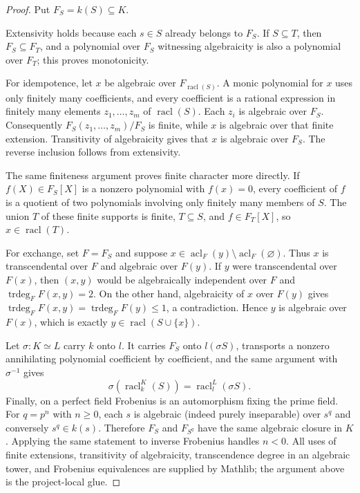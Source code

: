 \documentclass[11pt,oneside]{article}
\theoremstyle{definition}
\theoremstyle{remark}
\newcommand{\acl}{\operatorname{acl}}
\newcommand{\trdeg}{\operatorname{trdeg}}
\begin{document}
\begin{proof}
Put $F_S=k(S)\subseteq K$.

Extensivity holds because each $s\in S$ already belongs to $F_S$.  If $S\subseteq T$,
then $F_S\subseteq F_T$, and a polynomial over $F_S$ witnessing algebraicity is also a
polynomial over $F_T$; this proves monotonicity.

For idempotence, let $x$ be algebraic over
$F_{\operatorname{racl}(S)}$.  A monic polynomial for $x$ uses only finitely many
coefficients, and every coefficient is a rational expression in finitely many elements
$z_1,\ldots,z_m$ of $\operatorname{racl}(S)$.  Each $z_i$ is algebraic over $F_S$.
Consequently $F_S(z_1,\ldots,z_m)/F_S$ is finite, while $x$ is algebraic over that
finite extension.  Transitivity of algebraicity gives that $x$ is algebraic over $F_S$.
The reverse inclusion follows from extensivity.

The same finiteness argument proves finite character more directly.  If
$f(X)\in F_S[X]$ is a nonzero polynomial with $f(x)=0$, every coefficient of $f$ is a
quotient of two polynomials involving only finitely many members of $S$.  The union $T$
of these finite supports is finite, $T\subseteq S$, and $f\in F_T[X]$, so
$x\in\operatorname{racl}(T)$.

For exchange, set $F=F_S$ and suppose
$x\in\acl_F(y)\setminus\acl_F(\varnothing)$.  Thus $x$ is transcendental over $F$ and
algebraic over $F(y)$.  If $y$ were transcendental over $F(x)$, then $(x,y)$ would be
algebraically independent over $F$ and $\trdeg_FF(x,y)=2$.  On the other hand,
algebraicity of $x$ over $F(y)$ gives
$\trdeg_FF(x,y)=\trdeg_FF(y)\leq1$, a contradiction.  Hence $y$ is algebraic over
$F(x)$, which is exactly
$y\in\operatorname{racl}(S\cup\{x\})$.

Let $\sigma:K\simeq L$ carry $k$ onto $l$.  It carries $F_S$ onto
$l(\sigma S)$, transports a nonzero annihilating polynomial coefficient by coefficient,
and the same argument with $\sigma^{-1}$ gives
\[
 \sigma(\operatorname{racl}_{k}^{K}(S))
   =\operatorname{racl}_{l}^{L}(\sigma S).
\]
Finally, on a perfect field Frobenius is an automorphism fixing the prime field.  For
$q=p^n$ with $n\geq0$, each $s$ is algebraic (indeed purely inseparable) over $s^q$
and conversely $s^q\in k(s)$.  Therefore $F_S$ and $F_{S^q}$ have the same algebraic
closure in $K$.  Applying the same statement to inverse Frobenius handles $n<0$.
All uses of finite extensions, transitivity of algebraicity, transcendence degree in an
algebraic tower, and Frobenius equivalences are supplied by Mathlib; the argument above
is the project-local glue.
\end{proof}
\end{document}
